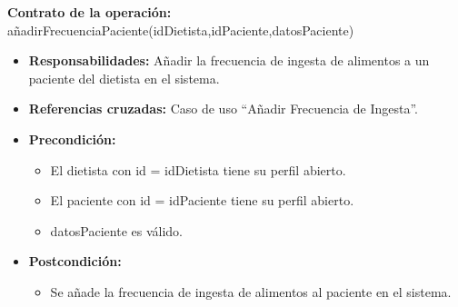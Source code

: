 \textbf{Contrato de la operación:} añadirFrecuenciaPaciente(idDietista,idPaciente,datosPaciente)
\begin{itemize}
\item \textbf{Responsabilidades:} Añadir la frecuencia de ingesta de alimentos a un paciente del dietista en el sistema.
\item \textbf{Referencias cruzadas:} Caso de uso ``Añadir Frecuencia de Ingesta''.
\item \textbf{Precondición:}
\begin{itemize}
\item El dietista con id = idDietista tiene su perfil abierto.
\item El paciente con id = idPaciente tiene su perfil abierto.
\item datosPaciente es válido.
\end{itemize}
\item \textbf{Postcondición:}
\begin{itemize}
\item Se añade la frecuencia de ingesta de alimentos al paciente en el sistema.
\end{itemize}
\end{itemize}


